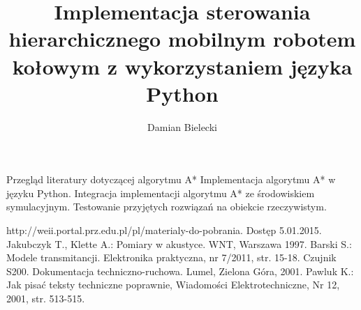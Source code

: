 \documentclass[12pt,twoside]{article}
\author{Damian Bielecki}
\title{Implementacja sterowania hierarchicznego mobilnym robotem kołowym z wykorzystaniem języka Python}
\begin{document}
\maketitle

\blankpage

\tableofcontents
Przegląd literatury dotyczącej algorytmu A*
Implementacja algorytmu A* w języku Python. 
Integracja implementacji algorytmu A* ze środowiskiem symulacyjnym.
Testowanie przyjętych rozwiązań na obiekcie rzeczywistym.
\clearpage
\blankpage











\clearpage


\begin{thebibliography}{4}
	 http://weii.portal.prz.edu.pl/pl/materialy-do-pobrania. Dostęp 5.01.2015.
	 Jakubczyk T., Klette A.: Pomiary w akustyce. WNT, Warszawa 1997.
	 Barski S.: Modele transmitancji. Elektronika praktyczna, nr 7/2011, str. 15-18.
	 Czujnik S200. Dokumentacja techniczno-ruchowa. Lumel, Zielona Góra, 2001.
	 Pawluk K.: Jak pisać teksty techniczne poprawnie, Wiadomości Elektrotechniczne, Nr 12, 2001, str. 513-515.
\end{thebibliography}

\clearpage

\makesummary
\end{document}
